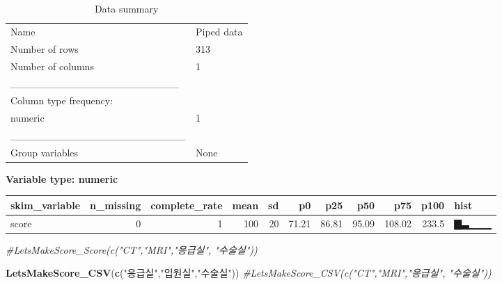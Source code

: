 \documentclass[
]{article}
\newenvironment{Shaded}{\begin{snugshade}}{\end{snugshade}}
\newcommand{\CommentTok}[1]{\textcolor[rgb]{0.56,0.35,0.01}{\textit{#1}}}
\newcommand{\KeywordTok}[1]{\textcolor[rgb]{0.13,0.29,0.53}{\textbf{#1}}}
\newcommand{\NormalTok}[1]{#1}
\newcommand{\StringTok}[1]{\textcolor[rgb]{0.31,0.60,0.02}{#1}}
\begin{document}
\begin{longtable}[]{@{}ll@{}}
\caption{Data summary}\tabularnewline
\toprule
\endhead
Name & Piped data\tabularnewline
Number of rows & 313\tabularnewline
Number of columns & 1\tabularnewline
\_\_\_\_\_\_\_\_\_\_\_\_\_\_\_\_\_\_\_\_\_\_\_ &\tabularnewline
Column type frequency: &\tabularnewline
numeric & 1\tabularnewline
\_\_\_\_\_\_\_\_\_\_\_\_\_\_\_\_\_\_\_\_\_\_\_\_ &\tabularnewline
Group variables & None\tabularnewline
\bottomrule
\end{longtable}

\textbf{Variable type: numeric}

\begin{longtable}[]{@{}lrrrrrrrrrl@{}}
\toprule
skim\_variable & n\_missing & complete\_rate & mean & sd & p0 & p25 &
p50 & p75 & p100 & hist\tabularnewline
\midrule
\endhead
score & 0 & 1 & 100 & 20 & 71.21 & 86.81 & 95.09 & 108.02 & 233.5 &
▇▃▁▁▁\tabularnewline
\bottomrule
\end{longtable}

\begin{Shaded}
\begin{Highlighting}[]
\CommentTok{#LetsMakeScore_Score(c("CT","MRI","응급실", "수술실"))}
\end{Highlighting}
\end{Shaded}

\begin{Shaded}
\begin{Highlighting}[]
\KeywordTok{LetsMakeScore_CSV}\NormalTok{(}\KeywordTok{c}\NormalTok{(}\StringTok{"응급실"}\NormalTok{,}\StringTok{"입원실"}\NormalTok{,}\StringTok{"수술실"}\NormalTok{))}
\CommentTok{#LetsMakeScore_CSV(c("CT","MRI","응급실", "수술실"))}
\end{Highlighting}
\end{Shaded}
\end{document}
